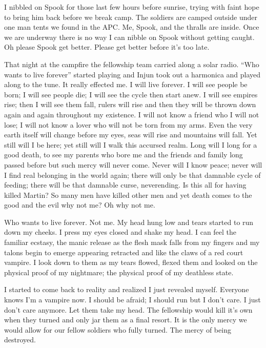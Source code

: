 I nibbled on Spook for those last few hours before sunrise, trying with faint hope to bring him back before we break camp. The soldiers are camped outside under one man tents we found in the APC. Me, Spook, and the thralls are inside. Once we are underway there is no way I can nibble on Spook without getting caught. Oh please Spook get better. Please get better before it's too late.

\parasep


That night at the campfire the fellowship team carried along a solar radio. ``Who wants to live forever'' started playing and Injun took out a harmonica and played along to the tune. It really effected me. I will live forever. I will see people be born; I will see people die; I will see the cycle then start anew. I will see empires rise; then I will see them fall, rulers will rise and then they will be thrown down again and again throughout my existence. I will not know a friend who I will not lose; I will not know a lover who will not be torn from my arms. Even the very earth itself will change before my eyes, seas will rise and mountains will fall. Yet still will I be here; yet still will I walk this accursed realm. Long will I long for a good death, to see my parents who bore me and the friends and family long passed before but such mercy will never come. Never will I know peace; never will I find real belonging in the world again; there will only be that damnable cycle of feeding; there will be that damnable curse, neverending. Is this all for having killed Martin? So many men have killed other men and yet death comes to the good and the evil why not me? Oh why not me.

Who wants to live forever. Not me. My head hung low and tears started to run down my cheeks. I press my eyes closed and shake my head. I can feel the familiar ecstasy, the manic release as the flesh mask falls from my fingers and my talons begin to emerge appearing retracted and like the claws of a red court vampire. I look down to them as my tears flowed, flexed them and looked on the physical proof of my nightmare; the physical proof of my deathless state.

I started to come back to reality and realized I just revealed myself. Everyone knows I'm a vampire now. I should be afraid; I should run but I don't care. I just don't care anymore. Let them take my head. The fellowship would kill it's own when they turned and only jar them as a final resort. It is the only mercy we would allow for our fellow soldiers who fully turned. The mercy of being destroyed.


